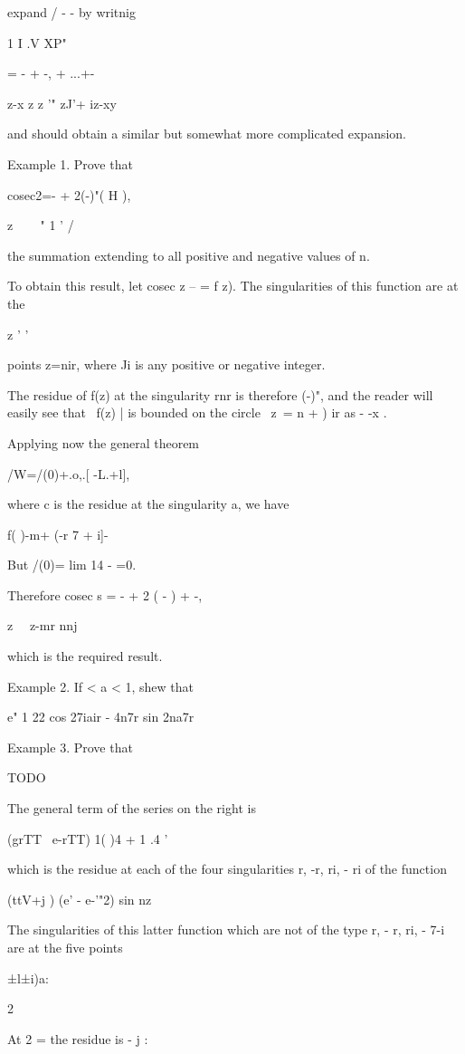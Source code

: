 expand / - - by writnig

1 I .V XP"

= - + -, + ...+-

z-x z z '" zJ'+ iz-xy

and should obtain a similar but somewhat more complicated expansion.

Example 1. Prove that

cosec2=- + 2(-)"( H ),

z \ \ ~ " 1 ' /

the summation extending to all positive and negative values of n.

To obtain this result, let cosec z -- = f z). The singularities of
this function are at the

z ' '

points z=nir, where Ji is any positive or negative integer.

The residue of f(z) at the singularity rnr is therefore (-)", and the
reader will easily see that \ f(z) | is bounded on the circle \ z\ = n
+ ) ir as - -x .

Applying now the general theorem

/W=/(0)+.o,.[ -L.+l],

where c is the residue at the singularity a, we have

f( )-m+ (-r 7 + i]-

But /(0)= lim 14 - =0.

Therefore cosec s = - + 2 ( - ) + -,

z \ \ z-mr nnj

which is the required result.

Example 2. If < a < 1, shew that

e" 1 22 cos 27iair - 4n7r sin 2na7r

Example 3. Prove that

TODO

The general term of the series on the right is

(grTT \ e-rTT) 1( )4 + 1 .4 '

which is the residue at each of the four singularities r, -r, ri, - ri
of the function

(ttV+j ) (e' - e-'"2) sin nz

%
%

The singularities of this latter function which are not of the type r,
- r, ri, - 7-i are at the five points

 ±l±i)a:

2

At 2 = the residue is - j :

